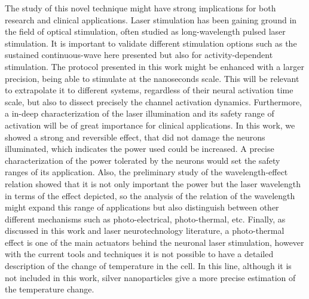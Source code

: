 The study of this novel technique might have strong implications for both research and clinical applications. Laser stimulation has been gaining ground in the field of optical stimulation, often studied as long-wavelength pulsed laser stimulation. It is important to validate different stimulation options such as the sustained continuous-wave here presented but also for activity-dependent stimulation. The protocol presented in this work might be enhanced with a larger precision, being able to stimulate at the nanoseconds scale. This will be relevant to extrapolate it to different systems, regardless of their neural activation time scale, but also to dissect precisely the channel activation dynamics. Furthermore, a in-deep characterization of the laser illumination and its safety range of activation will be of great importance for clinical applications. In this work, we showed a strong and reversible effect, that did not damage the neurons illuminated, which indicates the power used could be increased. A precise characterization of the power tolerated by the neurons would set the safety ranges of its application. Also, the preliminary study of the wavelength-effect relation showed that it is not only important the power but the laser wavelength in terms of the effect depicted, so the analysis  of the relation of the wavelength might expand this range of applications but also distinguish between other different mechanisms such as photo-electrical, photo-thermal, etc. Finally, as discussed in this work and laser neurotechnology literature, a photo-thermal effect is one of the main actuators behind the neuronal laser stimulation, however with the current tools and techniques it is not possible to have a detailed description of the change of temperature in the cell. In this line, although it is not included in this work, silver nanoparticles give a more precise estimation of the temperature change. 




